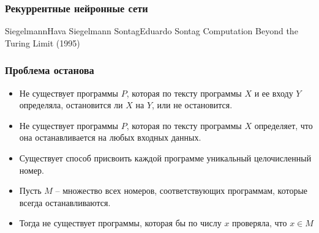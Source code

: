 \documentclass[24pt,pdf,hyperref={unicode}]{beamer}
\begin{document}
\begin{frame}\frametitle{Рекуррентные нейронные сети}
\end{frame}

\begin{frame}
\doublebio
{Siegelmann}{Hava Siegelmann}
{Sontag}{Eduardo Sontag}
{
Computation Beyond the Turing Limit (1995)
}
\end{frame}

\begin{frame}\frametitle{Проблема останова}
\begin{itemize}
\item Не существует программы $P$, которая по тексту программы $X$ и ее входу $Y$ определяла, остановится ли $X$ на $Y$, или не остановится.
\item Не существует программы $P$, которая по тексту программы $X$ определяет, что она останавливается на любых входных данных.
\item Существует способ присвоить каждой программе уникальный целочисленный номер.
\item Пусть $M$ -- множество всех номеров, соответствующих программам, которые всегда останавливаются.
\item Тогда не существует программы, которая бы по числу $x$ проверяла, что $x\in M$
\end{itemize}
\end{frame}
\end{document}
